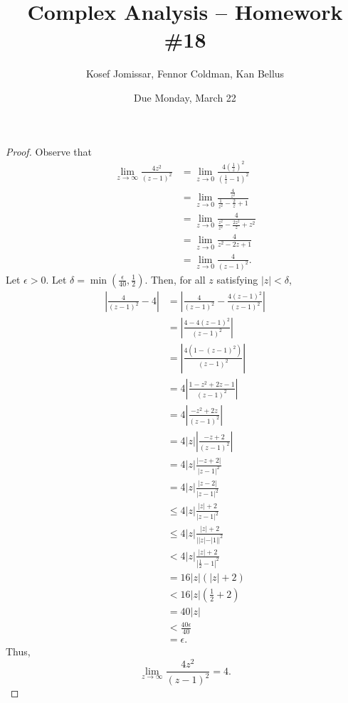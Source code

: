 \documentclass[11pt]{article}		%
\title{Complex Analysis -- Homework \#18}
\author{Kosef Jomissar, Fennor Coldman, Kan Bellus}
\date{Due Monday, March 22}
\theoremstyle{definition}
\begin{document}
\color{white}
\pagecolor{black}
\maketitle

\begin{proof}
    Observe that
    \begin{align*}
        \lim_{z\to \infty}\frac{4z^2}{(z-1)^2} &= \lim_{z\to 0}\frac{4\left(\frac1z\right)^2}{\left(\frac1z-1\right)^2} \\
        &= \lim_{z\to 0}\frac{\frac4{z^2}}{\frac1{z^2}-\frac2z + 1} \\
        &= \lim_{z\to 0}\frac{4}{\frac{z^2}{z^2}-\frac{2z^2}z + z^2} \\
        &= \lim_{z\to 0}\frac{4}{z^2 - 2z + 1} \\
        &= \lim_{z\to 0}\frac{4}{(z-1)^2}.
    \end{align*}
    Let $\epsilon > 0$.
    Let $\delta = \min\left(\frac{\epsilon}{40}, \frac12\right)$.
    Then, for all $z$ satisfying $|z| < \delta$,
    \begin{align*}
        \left| \frac{4}{(z-1)^2} - 4 \right| &= \left| \frac{4}{(z-1)^2} -\frac{4(z-1)^2}{(z-1)^2} \right| \\
        &= \left| \frac{4 - 4(z-1)^2}{(z-1)^2} \right| \\
        &= \left| \frac{4\left(1 - (z-1)^2\right)}{(z-1)^2} \right| \\
        &= 4\left| \frac{1 - z^2 + 2z - 1}{(z-1)^2} \right| \\
        &= 4\left| \frac{-z^2 + 2z}{(z-1)^2} \right| \\
        &= 4|z|\left| \frac{-z + 2}{(z-1)^2} \right| \\
        &= 4|z| \frac{|-z + 2|}{|z-1|^2} \\
        &= 4|z| \frac{|z - 2|}{|z-1|^2} \\
        &\leq 4|z| \frac{|z| + 2}{|z-1|^2} \\
        &\leq 4|z| \frac{|z| + 2}{||z|-|1||^2} \\
        &< 4|z| \frac{|z| + 2}{\left|\frac12-1\right|^2} \\
        &= 16|z|(|z| + 2) \\
        &< 16|z|\left(\frac12 + 2\right) \\
        &= 40|z| \\
        &< \frac{40\epsilon}{40} \\
        &= \epsilon.
    \end{align*}
    Thus, $$\lim_{z\to \infty}\frac{4z^2}{(z-1)^2} = 4.$$
\end{proof}
\end{document}
